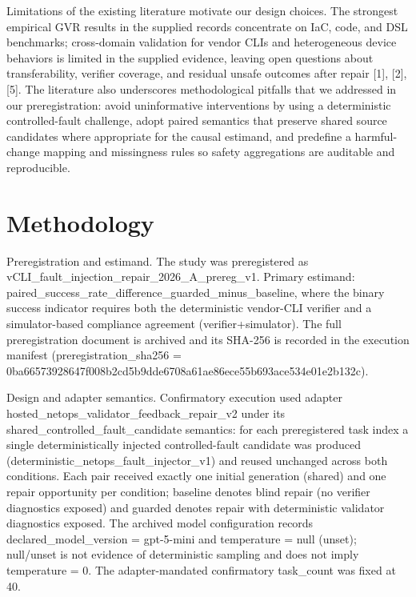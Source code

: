 \documentclass[conference]{IEEEtran}
\begin{document}
Limitations of the existing literature motivate our design choices. The strongest empirical GVR results in the supplied records concentrate on IaC, code, and DSL benchmarks; cross-domain validation for vendor CLIs and heterogeneous device behaviors is limited in the supplied evidence, leaving open questions about transferability, verifier coverage, and residual unsafe outcomes after repair [1], [2], [5]. The literature also underscores methodological pitfalls that we addressed in our preregistration: avoid uninformative interventions by using a deterministic controlled-fault challenge, adopt paired semantics that preserve shared source candidates where appropriate for the causal estimand, and predefine a harmful-change mapping and missingness rules so safety aggregations are auditable and reproducible.

\section{Methodology}
Preregistration and estimand. The study was preregistered as vCLI\_fault\_injection\_repair\_2026\_A\_prereg\_v1. Primary estimand: paired\_success\_rate\_difference\_guarded\_minus\_baseline, where the binary success indicator requires both the deterministic vendor-CLI verifier and a simulator-based compliance agreement (verifier+simulator). The full preregistration document is archived and its SHA-256 is recorded in the execution manifest (preregistration\_sha256 = 0ba66573\allowbreak{}928647f0\allowbreak{}08b2cd5b\allowbreak{}9dde6708\allowbreak{}a61ae86e\allowbreak{}ce55b693\allowbreak{}ace534e0\allowbreak{}1e2b132c).

Design and adapter semantics. Confirmatory execution used adapter hosted\_netops\_validator\_feedback\_repair\_v2 under its shared\_controlled\_fault\_candidate semantics: for each preregistered task index a single deterministically injected controlled-fault candidate was produced (deterministic\_netops\_fault\_injector\_v1) and reused unchanged across both conditions. Each pair received exactly one initial generation (shared) and one repair opportunity per condition; baseline denotes blind repair (no verifier diagnostics exposed) and guarded denotes repair with deterministic validator diagnostics exposed. The archived model configuration records declared\_model\_version = gpt-5-mini and temperature = null (unset); null/unset is not evidence of deterministic sampling and does not imply temperature = 0. The adapter-mandated confirmatory task\_count was fixed at 40.
\end{document}
